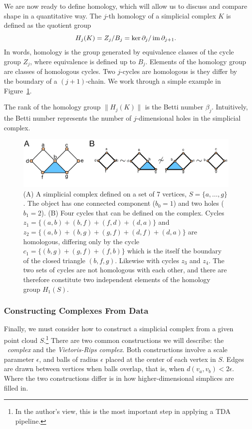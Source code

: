 We are now ready to define homology, which will allow us to discuss and compare shape in a quantitative way.
The $j$-th homology of a simplicial complex $K$ is defined as the quotient group
\begin{equation}
H_{j}(K) = Z_{j} / B_{j} = \ker\partial_{j} / \operatorname{im}\partial_{j+1}.
\end{equation}
In words, homology is the group generated by equivalence classes of the cycle group $Z_{j}$, where equivalence is defined up to $B_{j}$.
Elements of the homology group are classes of homologous cycles.
Two $j$-cycles are homologous is they differ by the boundary of a $(j+1)$-chain.
We work through a simple example in Figure~\ref{fig:bg:homology_example}.

The rank of the homology group $\|H_{j}(K)\|$ is the Betti number $\beta_j$.
Intuitively, the Betti number represents the number of $j$-dimensional holes in the simplicial complex.

\begin{figure}
\centering
\includegraphics[]{./fig/background/homology_example.pdf}
\caption[Simplicial Homology]{(A) A simplicial complex defined on a set of 7 vertices, $S=\{a,\ldots,g\}$. The object has one connected component ($b_0=1$) and two holes ($b_1=2$). (B) Four cycles that can be defined on the complex. Cycles $z_1=\{(a,b)+(b,f)+(f,d)+(d,a)\}$ and $z_2=\{(a,b)+(b,g)+(g,f)+(d,f)+(d,a)\}$ are homologous, differing only by the cycle $c_1=\{(b,g)+(g,f)+(f,b)\}$ which is the itself the boundary of the closed triangle $(b,f,g)$. Likewise with cycles $z_3$ and $z_4$. The two sets of cycles are not homologous with each other, and there are therefore constitute two independent elements of the homology group $H_1(S)$.}
\label{fig:bg:homology_example}
\end{figure}

\subsubsection{Constructing Complexes From Data}
\label{bg:tda:math:complexes}

Finally, we must consider how to construct a simplicial complex from a given point cloud $S$.\footnote{In the author's view, this is the most important step in applying a TDA pipeline.}
There are two common constructions we will describe: the \emph{\Cech\ complex} and the \emph{Vietoris-Rips complex}.
Both constructions involve a scale parameter $\epsilon$, and balls of radius $\epsilon$ placed at the center of each vertex in $S$.
Edges are drawn between vertices when balls overlap, that is, when $d(v_{a},v_{b})<2\epsilon$.
Where the two constructions differ is in how higher-dimensional simplices are filled in.


